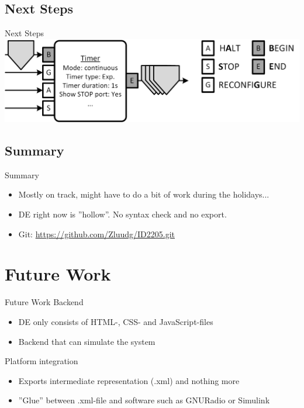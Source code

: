 \documentclass{beamer}
\begin{document}
\subsection{Next Steps}
\begin{frame}{Next Steps}
 		\includegraphics[width=\linewidth]{simple_timer_complete.png}
\end{frame}

\subsection*{Summary}
\begin{frame}{Summary}
\begin{itemize}
	\item Mostly on track, might have to do a bit of work during the holidays...
	\item DE right now is ''hollow''. No syntax check and no export.
	\item Git: \url{https://github.com/Zluudg/ID2205.git}
\end{itemize}
\end{frame}

\section*{Future Work}
\begin{frame}{Future Work}
	Backend
	\begin{itemize}
		\item DE only consists of HTML-, CSS- and JavaScript-files
		\item<2-> Backend that can simulate the system
	\end{itemize}
	Platform integration
	\begin{itemize}
		\item Exports intermediate representation (.xml) and nothing more
		\item<3-> ''Glue'' between .xml-file and software such as GNURadio or Simulink
	\end{itemize}
\end{frame}
\end{document}
